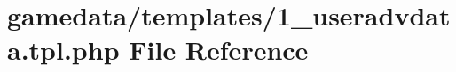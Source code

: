 \hypertarget{1__useradvdata_8tpl_8php}{\section{gamedata/templates/1\+\_\+useradvdata.tpl.\+php File Reference}
\label{1__useradvdata_8tpl_8php}
}
